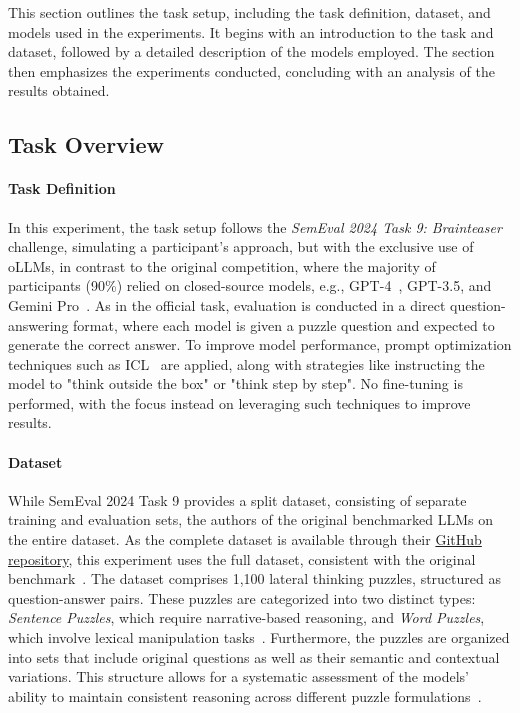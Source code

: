 This section outlines the task setup, including the task definition, dataset, and models used in the experiments. It begins with an introduction to the task and dataset, followed by a detailed description of the models employed. The section then emphasizes the experiments conducted, concluding with an analysis of the results obtained.

\subsection{Task Overview}

\paragraph{Task Definition}
In this experiment, the task setup follows the \textit{SemEval 2024 Task 9: Brainteaser}~\cite{jiangBRAINTEASERLateralThinking2023} challenge, simulating a participant's approach, but with the exclusive use of \acp{oLLM}, in contrast to the original competition, where the majority of participants (90\%) relied on closed-source models, e.g., \acs{GPT}-4~\cite{openaiGPT4TechnicalReport2024}, \acs{GPT}-3.5, and Gemini Pro~\cite{teamGeminiFamilyHighly2024}. As in the official task, evaluation is conducted in a direct question-answering format, where each model is given a puzzle question and expected to generate the correct answer. To improve model performance, prompt optimization techniques such as \ac{ICL}~\cite{brownLanguageModelsAre2020} are applied, along with strategies like instructing the model to "think outside the box" or "think step by step". No fine-tuning is performed, with the focus instead on leveraging such techniques to improve results.

\paragraph{Dataset}
While SemEval 2024 Task 9 provides a split dataset, consisting of separate training and evaluation sets, the authors of the original  benchmarked LLMs on the entire dataset. As the complete dataset is available through their \href{https://github.com/1171-jpg/BrainTeaser}{GitHub repository}, this experiment uses the full dataset, consistent with the original benchmark~\cite{jiangBRAINTEASERLateralThinking2023}. The dataset comprises 1,100 lateral thinking puzzles, structured as question-answer pairs. These puzzles are categorized into two distinct types: \textit{Sentence Puzzles}, which require narrative-based reasoning, and \textit{Word Puzzles}, which involve lexical manipulation tasks~\cite{jiangBRAINTEASERLateralThinking2023}. Furthermore, the puzzles are organized into sets that include original questions as well as their semantic and contextual variations. This structure allows for a systematic assessment of the models' ability to maintain consistent reasoning across different puzzle formulations~\cite{jiangBRAINTEASERLateralThinking2023}.

